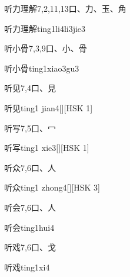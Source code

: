 \begin{Entry}{听力理解}{7,2,11,13}{⼝、⼒、⽟、⾓}
  \begin{Phonetics}{听力理解}{ting1li4li3jie3}
  \end{Phonetics}
\end{Entry}

\begin{Entry}{听小骨}{7,3,9}{⼝、⼩、⾻}
  \begin{Phonetics}{听小骨}{ting1xiao3gu3}
  \end{Phonetics}
\end{Entry}

\begin{Entry}{听见}{7,4}{⼝、⾒}
  \begin{Phonetics}{听见}{ting1 jian4}[][HSK 1]
  \end{Phonetics}
\end{Entry}

\begin{Entry}{听写}{7,5}{⼝、⼍}
  \begin{Phonetics}{听写}{ting1 xie3}[][HSK 1]
  \end{Phonetics}
\end{Entry}

\begin{Entry}{听众}{7,6}{⼝、⼈}
  \begin{Phonetics}{听众}{ting1 zhong4}[][HSK 3]
  \end{Phonetics}
\end{Entry}

\begin{Entry}{听会}{7,6}{⼝、⼈}
  \begin{Phonetics}{听会}{ting1hui4}
  \end{Phonetics}
\end{Entry}

\begin{Entry}{听戏}{7,6}{⼝、⼽}
  \begin{Phonetics}{听戏}{ting1xi4}
  \end{Phonetics}
\end{Entry}

